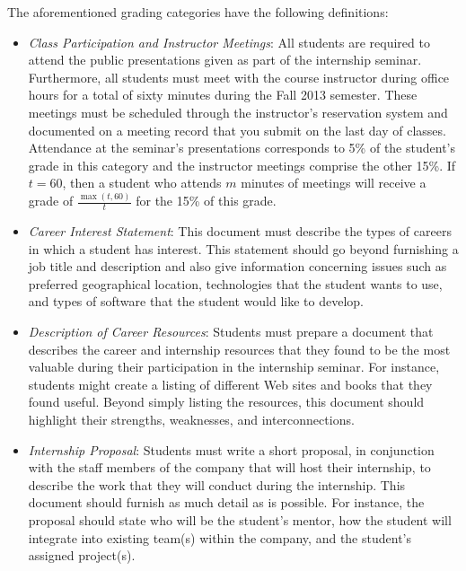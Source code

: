 \noindent
The aforementioned grading categories have the following definitions:

\begin{itemize}

	\item {\em Class Participation and Instructor Meetings}: All students are required to attend the public
		presentations given as part of the internship seminar.  Furthermore, all students must meet with the
		course instructor during office hours for a total of sixty minutes during the Fall 2013 semester.  These
		meetings must be scheduled through the instructor's reservation system and documented on a meeting record that
		you submit on the last day of classes. Attendance at the seminar's presentations corresponds to 5\% of
		the student's grade in this category and the instructor meetings comprise the other 15\%. If $t=60$, then a
		student who attends $m$ minutes of meetings will receive a grade of $\frac{\max{(t,60)}}{t}$ for the 15\%
		of this grade.
		
	\item {\em Career Interest Statement}: This document must describe the types of careers in which a student has
		interest. This statement should go beyond furnishing a job title and description and also give
		information concerning issues such as preferred geographical location, technologies that the student wants to
		use, and types of software that the student would like to develop. 	

	\item {\em Description of Career Resources}:  Students must prepare a document that describes the career and
		internship resources that they found to be the most valuable during their participation in the internship
		seminar. For instance, students might create a listing of different Web sites and books that they found useful. 
		Beyond simply listing the resources, this document should highlight their strengths, weaknesses, and interconnections. 		

	\item {\em Internship Proposal}: Students must write a short proposal, in conjunction with the staff members of the
		company that will host their internship, to describe the work that they will conduct during the internship.
		This document should furnish as much detail as is possible.  For instance, the proposal should state who will be
		the student's mentor, how the student will integrate into existing team(s) within the company, and the
		student's assigned project(s). 


\end{itemize}
